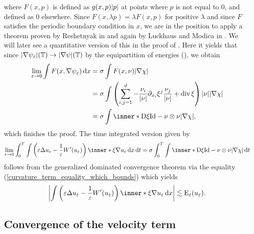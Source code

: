 where $ F ( x, p ) $ is defined as $ g ( x , p ) \abs{ p } $ at points where $ 
p $ is
not equal to 0, and defined as 0 elsewhere. Since $ F (x , \lambda p ) = 
\lambda F ( x, p ) $ for positive $ \lambda $ and since $ F $ satisfies the 
periodic boundary condition in $ x $, we are in the position to apply a 
theorem proven by Reshetnyak in \cite{Reshetnyak_weak_convergence} and again by 
Luckhaus and Modica in \cite{luckhaus_modica_gibbs_thompson_relation}. We 
will later see a quantitative version of this in the proof of
. 
Here it yields that since $ \abs{ \nabla \psi_{ 
\varepsilon  } } ( \operatorname{\mathbb{T}} ) \to \abs{ \nabla \psi } ( \operatorname{\mathbb{T}} ) $ by the 
equipartition of energies (), we obtain
\begin{align*}
	\lim_{ \varepsilon \to 0 }
	\int
	F ( x, \nabla \psi_{ \varepsilon } )
	\dd{ x }
	& =
	\sigma
	\int
	F ( x , \nu )
	\abs{ \nabla \chi }
	\\
	& = 
	\sigma
	\int
	\left(
	\sum_{ i, j = 1}^{ d }
	-
	\frac{ \nu_{ i } }{ \abs{ \nu } }
	\partial_{ x_{ i } } \xi^{ j }
	\frac{ \nu_{ j } }{ \abs{ \nu } }
	+
	\divg \xi 
	\right)
	\abs{ \nu }
	\abs{ \nabla \chi }
	\\
	& =
	\sigma
	\int
	\inner*{ \diff \xi }{ \mathrm{Id} - \nu \otimes \nu }
	\abs{ \nabla \chi },
\end{align*}
which finishes the proof.
The time integrated version given by
\begin{equation*}
	\lim_{ \varepsilon \to 0 }
	\int_{ 0 }^{ T }
	\int
	\left(
	\varepsilon \Delta u_{ \varepsilon }
	- 
	\frac{ 1 }{ \varepsilon }
	W'( u_{ \varepsilon } )
	\right)
	\inner*{ \xi }{ \nabla u_{ \varepsilon } }
	\dd{ x }
	\dd{ t }
	=
	\sigma
	\int_{ 0 }^{ T }
	\int
	\inner*{ \diff \xi }{ \mathrm{Id} - \nu \otimes \nu }
	\abs{ \nabla \chi }
	\dd{ t }
\end{equation*} 
follows from the generalized dominated convergence theorem via the equality 
(\ref{curvature_term_equality_which_bounds}) which yields
\begin{equation*}
	\abs{
		\int
		\left(
		\varepsilon \Delta u_{ \varepsilon } 
		-
		\frac{ 1 }{ \varepsilon }
		W'( u_{ \varepsilon } )
		\right)
		\inner*{ \xi } { \nabla u_{ \varepsilon } }
		\dd{ x }
	}
	\lesssim
	\energy_{ \varepsilon } ( u_{ \varepsilon } ).
\end{equation*}


\subsection{Convergence of the velocity term}

